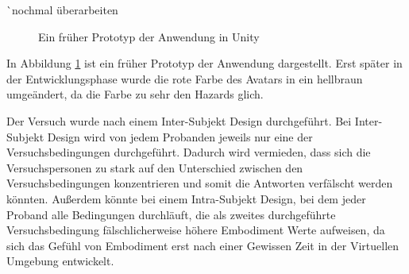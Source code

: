 ^^ nochmal überarbeiten

\begin{figure}[h]
  \caption[Altes Setup der Anwendung]{Ein früher Prototyp der Anwendung in Unity}
  \label{fig:oldSetup}
\end{figure}

In Abbildung \ref{fig:oldSetup} ist ein früher Prototyp der Anwendung dargestellt. Erst später in der Entwicklungsphase wurde die rote Farbe des Avatars in ein hellbraun umgeändert, da die Farbe zu sehr den Hazards glich.


Der Versuch wurde nach einem Inter-Subjekt Design durchgeführt. Bei Inter-Subjekt Design wird von jedem Probanden jeweils nur eine der Versuchsbedingungen durchgeführt. Dadurch wird vermieden, dass sich die Versuchspersonen zu stark auf den Unterschied zwischen den Versuchsbedingungen konzentrieren und somit die Antworten verfälscht werden könnten. Außerdem könnte bei einem Intra-Subjekt Design, bei dem jeder Proband alle Bedingungen durchläuft, die als zweites durchgeführte Versuchsbedingung fälschlicherweise höhere Embodiment Werte aufweisen, da sich das Gefühl von Embodiment erst nach einer Gewissen Zeit in der Virtuellen Umgebung entwickelt.


